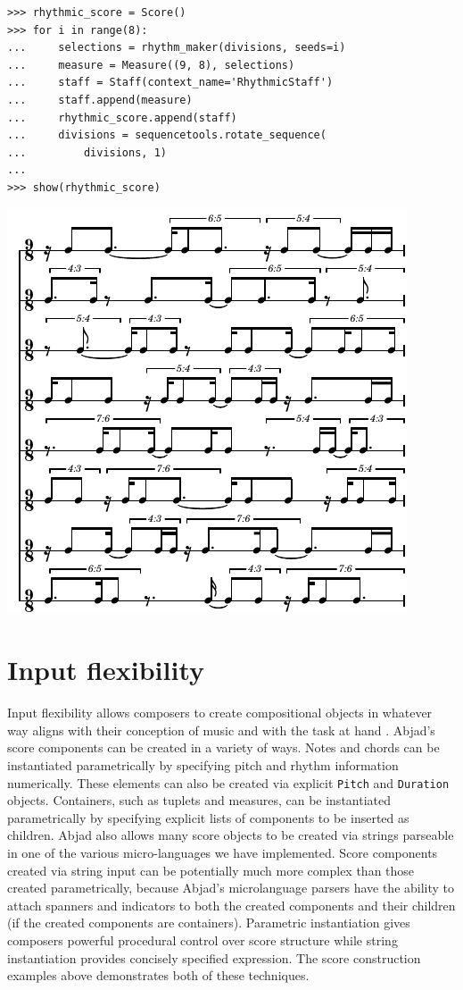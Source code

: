 \documentclass{article}
\begin{document}
\begin{lstlisting}
>>> rhythmic_score = Score()
>>> for i in range(8):
...     selections = rhythm_maker(divisions, seeds=i)
...     measure = Measure((9, 8), selections)
...     staff = Staff(context_name='RhythmicStaff')
...     staff.append(measure)
...     rhythmic_score.append(staff)
...     divisions = sequencetools.rotate_sequence(
...         divisions, 1)
...
>>> show(rhythmic_score)
\end{lstlisting}
\includegraphics{assets/lilypond-89acf493fafea6ee83e3032bbed09718.pdf}

\section{Input flexibility} \label{sec:input-flexibility}

Input flexibility allows composers to create compositional objects in whatever
way aligns with their conception of music and with the task at hand
\cite{Kay:1996vn}. Abjad's score components can be created in a variety of
ways. Notes and chords can be instantiated parametrically by specifying pitch
and rhythm information numerically. These elements can also be created via
explicit \texttt{Pitch} and \texttt{Duration} objects. Containers, such as
tuplets and measures, can be instantiated parametrically by specifying explicit
lists of components to be inserted as children. Abjad also allows many score
objects to be created via strings parseable in one of the various
micro-languages we have implemented. Score components created via string input
can be potentially much more complex than those created parametrically, because
Abjad's microlanguage parsers have the ability to attach spanners and
indicators to both the created components and their children (if the created
components are containers). Parametric instantiation gives composers powerful
procedural control over score structure while string instantiation provides
concisely specified expression. The score construction examples above
demonstrates both of these techniques.
\end{document}
